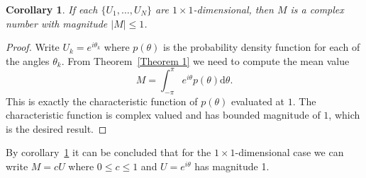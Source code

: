 \documentclass[aps,pra,twocolumn,superscriptaddress,numerical,floatfix]{revtex4-1}
\newtheorem{corollary}{Corollary}
\begin{document}
\begin{corollary}
\label{Corollary 1}
	If each $\{U_1,\ldots,U_N\}$ are $1 \times 1$-dimensional, then $M$ is a complex number with magnitude $|M| \leq 1$.
\end{corollary}
\begin{proof}
	Write $U_k = e^{i \theta_k}$ where $p(\theta)$ is the probability density function for each of the angles $\theta_k$. From Theorem~\ref{Theorem 1} we need to compute the mean value 
	\begin{equation}
		M = \int^\pi_{-\pi} e^{i\theta} p(\theta) \mathrm{d}\theta. \label{eq:single parameter, single mode}
	\end{equation}
This is exactly the characteristic function of $p(\theta)$ evaluated at $1$.  The characteristic function is complex valued and has bounded magnitude of $1$, which is the desired result.
\end{proof}

By corollary~\ref{Corollary 1} it can be concluded that for the $1\times1$-dimensional case we can write $M=cU$ where $0 \leq c \leq 1$ and $U=e^{i\theta}$ has magnitude 1.  
\end{document}
